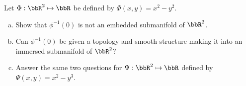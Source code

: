 Let $\Phi:\bbR^2 \mapsto \bbR$ be defined by $\Phi(x,y)= x^2 - y^2$.
\begin{enumerate}[a)]
\item Show that $\phi^{-1}(0)$ is not an embedded submanifold of $\bbR^2$.
\item Can $\phi^{-1}(0)$ be given a topology and smooth structure making it into an immersed submanifold of $\bbR^2$?
\item Answer the same two questions for $\Psi:\bbR^2\mapsto\bbR$ defined by $\Psi(x,y)=x^2-y^3$.
\end{enumerate}